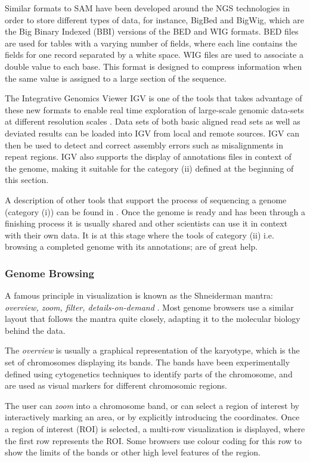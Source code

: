 Similar formats to SAM have been developed around the NGS technologies in order to store different types of data, for instance, BigBed and BigWig, which are the Big Binary Indexed (BBI) versions of the BED and WIG formats. BED files are used for tables with a varying number of fields, where each line contains the fields for one record separated by a white space. WIG files are used to associate a double value to each base. This format is designed to compress information when the same value is assigned to a large section of the sequence\cite{KEN2010}.

The Integrative Genomics Viewer IGV is one of the tools that takes advantage of these new formats to enable real time exploration of large-scale genomic data-sets at different resolution scales \cite{ROB2011}. Data sets of both basic aligned read sets as well as deviated results can be loaded into IGV from local and remote sources. IGV can then be used to detect and correct assembly errors such as misalignments in repeat regions. IGV also supports the display of annotations files in context of the genome, making it suitable for the category (ii) defined at the beginning of this section.

A description of other tools that support the process of sequencing a genome (category (i)) can be found in \cite{NIE2010}. Once the genome is ready and has been through a finishing process it is usually shared and other scientists can use it in context with their own data. It is at this stage where the tools of category (ii) i.e. browsing a completed genome with its annotations; are of great help.

\subsubsection{Genome Browsing}
A famous principle in visualization is known as the Shneiderman mantra: \emph{overview, zoom, filter, details-on-demand} \cite{SHN1996}. Most genome browsers use a similar layout that follows the mantra quite closely, adapting it to the molecular biology behind the data.

The \emph{overview} is usually a graphical representation of the karyotype, which is the set of chromosomes displaying its bands. The bands have been experimentally defined using cytogenetics techniques to identify parts of the chromosome, and are used as visual markers for different chromosomic regions.

The user can \emph{zoom} into a chromosome band, or can select a region of interest by interactively marking an area, or by explicitly introducing the coordinates. Once a region of interest (ROI) is selected, a multi-row visualization is displayed, where the first row represents the ROI. Some browsers use colour coding for this row to show the limits of the bands or other high level features of the region.

